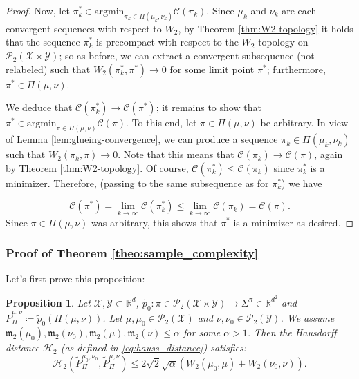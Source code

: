 \documentclass{article}
\newcommand{\R}{\mathbb{R}}
\newcommand{\Y}{\mathcal{Y}}
\newcommand{\X}{\mathcal{X}}
\newcommand{\1}{\mathbf{1}}
\renewcommand{\P}{\mathcal{P}}
\newtheorem{proposition}{Proposition}
\theoremstyle{definition}
\theoremstyle{remark}
\begin{document}
\begin{appendices}
\begin{proof}
Now, let $\pi_{k}^{*}\in\text{argmin}_{\pi_{k}\in\Pi(\mu_{k},\nu_{k})}\mathcal{C}(\pi_{k})$.
Since $\mu_{k}$ and $\nu_{k}$ are each convergent sequences with
respect to $W_{2}$, by Theorem \ref{thm:W2-topology}
it holds that the sequence $\pi_{k}^{*}$ is precompact with respect
to the $W_{2}$ topology on $\mathcal{P}_{2}(\mathcal{X}\times\mathcal{Y})$;
so as before, we can extract a convergent subsequence (not relabeled)
such that $W_{2}(\pi_{k}^{*},\pi^{*})\rightarrow0$ for some limit
point $\pi^{*}$; furthermore, $\pi^{*}\in\Pi(\mu,\nu)$.

We deduce that $\mathcal{C}(\pi_{k}^{*})\rightarrow\mathcal{C}(\pi^{*})$;
it remains to show that $\pi^{*}\in\text{argmin}_{\pi\in\Pi(\mu,\nu)}\mathcal{C}(\pi)$.
To this end, let $\pi\in\Pi(\mu,\nu)$ be arbitrary. In view of Lemma
\ref{lem:glueing-convergence}, we can produce a sequence $\pi_{k}\in\Pi(\mu_{k},\nu_{k})$
such that $W_{2}(\pi_{k},\pi)\rightarrow0$. Note that this means
that $\mathcal{C}(\pi_{k})\rightarrow\mathcal{C}(\pi)$, again by Theorem \ref{thm:W2-topology}. Of course,
$\mathcal{C}(\pi_{k}^{*})\leq\mathcal{C}(\pi_{k})$ since $\pi_{k}^{*}$
is a minimizer. Therefore, (passing to the same subsequence as for
$\pi_{k}^{*}$) we have 

\[
\mathcal{C}(\pi^{*})=\lim_{k\rightarrow\infty}\mathcal{C}(\pi_{k}^{*})\leq\lim_{k\rightarrow\infty}\mathcal{C}(\pi_{k})=\mathcal{C}(\pi).
\]
Since $\pi\in\Pi(\mu,\nu)$ was arbitrary, this shows that
$\pi^{*}$ is a minimizer as desired.
\end{proof}

\subsubsection*{Proof of Theorem \ref{theo:sample_complexity}}
Let's first prove this proposition:
\begin{proposition}\label{prop:conv_P_Pi} Let $\X,\Y\subset\R^d$, $\tilde{p}_0:\pi\in\P_2(\X\times\Y)\mapsto \Sigma^\pi\in \R^{d^2}$ and  $\tilde{P}_\Pi^{\mu,\nu}\coloneqq \tilde{p}_0(\Pi(\mu,\nu))$.  Let $\mu,\mu_0\in\mathcal{P}_2(\X)$ and $\nu,\nu_0\in\mathcal{P}_2(\Y)$.
We assume $\mathfrak{m}_2(\mu_{0}),\mathfrak{m}_2(\nu_{0}),\mathfrak{m}_2(\mu),\mathfrak{m}_2(\nu)\leq \alpha$ for some $\alpha>1$. Then the Hausdorff distance $\mathcal{H}_2$ (as defined in \eqref{eq:hauss_distance}) satisfies:
\begin{equation}\label{eq:hauss_conver_W_2}
    \mathcal{H}_2(\tilde{P}_\Pi^{\mu_0,\nu_0},\tilde{P}_\Pi^{\mu,\nu})\leq 2\sqrt{2} \sqrt{\alpha }(W_2 (\mu_{0},\mu)+W_2(\nu_{0},\nu) ).
\end{equation}
\end{proposition}


\end{appendices}
\end{document}
